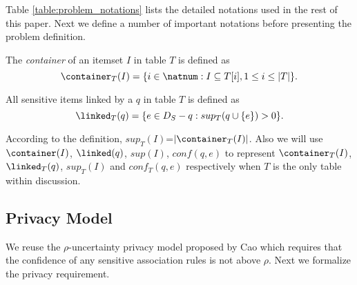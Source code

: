 Table \ref{table:problem_notations} lists the detailed notations used in the
rest of this paper. Next we define a number of important notations before
presenting the problem definition.

\begin{definition}[Container]
The \emph{container} of an itemset $I$ in table $T$ is defined as \[
\container_T(I) = \{ i \in \natnum : I \subseteq T[i], 1 \leq i \leq |T| \}
.\]
\end{definition}

\begin{definition}
All sensitive items linked by a \qid $q$ in table $T$ is defined as \[
\linked_T(q) = \{ e \in D_S-q : sup_{T}(q\cup\{e\}) > 0 \} .\]
\end{definition}
 According to the definition, $sup_{T}(I)$=$|\container_T(I)|$.
 Also we will use $\container(I)$, $\linked(q)$, $sup(I)$, 
$conf(q,e)$ to represent $\container_T(I)$, $\linked_T(q)$, $sup_{T}(I)$ and
$conf_{T}(q,e)$ respectively when $T$ is the only table within discussion.

\subsection{Privacy Model}
We reuse the $\rho$-uncertainty privacy model
proposed by Cao \etal \cite{Cao:2010:rho} which requires that the confidence of any sensitive
association rules is not above $\rho$. Next we formalize the
privacy requirement.

